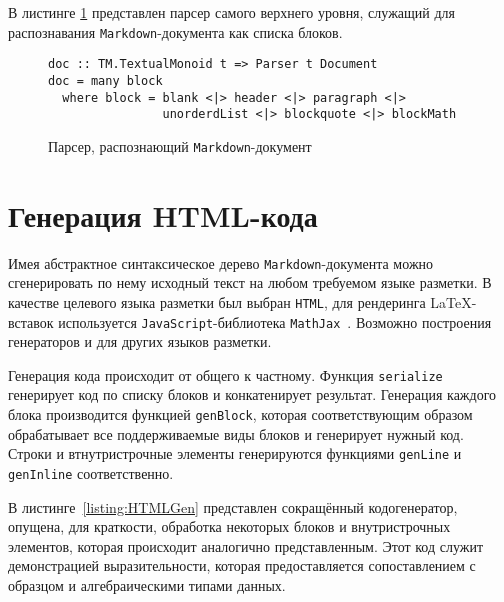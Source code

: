 В листинге \ref{listing:MarkdownDoc} представлен парсер самого верхнего уровня,
служащий для распознавания \lstinline{Markdown}-документа как списка блоков.

\begin{figure}[h]
\begin{lstlisting}
doc :: TM.TextualMonoid t => Parser t Document
doc = many block
  where block = blank <|> header <|> paragraph <|>
                unorderdList <|> blockquote <|> blockMath
\end{lstlisting}
\caption{Парсер, распознающий \lstinline{Markdown}-документ}
\label{listing:MarkdownDoc}
\end{figure}

\section{Генерация HTML-кода}

Имея абстрактное синтаксическое дерево \lstinline{Markdown}-документа можно
сгенерировать по нему исходный текст на любом требуемом языке разметки.
В качестве целевого языка разметки был выбран \lstinline{HTML}, для рендеринга
\LaTeX-вставок используется \lstinline{JavaScript}-библиотека
\lstinline{MathJax}~\autocite{MathJax}. Возможно построения генераторов и для
других языков разметки.

Генерация кода происходит от общего к частному. Функция \lstinline{serialize}
генерирует код по списку блоков и конкатенирует результат. Генерация каждого 
блока производится функцией \lstinline{genBlock}, которая соответствующим
образом обрабатывает все поддерживаемые виды блоков и генерирует нужный код. 
Строки и втнутристрочные элементы генерируются функциями \lstinline{genLine} и 
\lstinline{genInline} соответственно.

В листинге~\ref{listing:HTMLGen} представлен сокращённый кодогенератор, опущена,
для краткости, обработка некоторых блоков и внутристрочных элементов, которая
происходит аналогично представленным. Этот код служит демонстрацией
выразительности, которая предоставляется сопоставлением с образцом и
алгебраическими типами данных.

